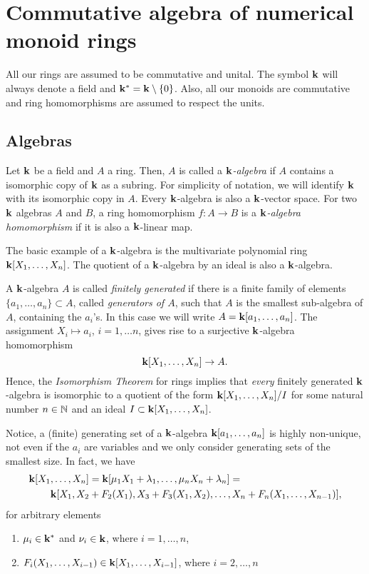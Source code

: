 \chapter{Commutative algebra of numerical monoid rings}

All our rings are assumed to be commutative and unital. The symbol $\mathbf{k}$ will always denote a field and $\mathbf{k}^*=\mathbf{k}\setminus\{0\}$. Also, all our monoids are commutative and ring homomorphisms are assumed to respect the units.

\section{Algebras}

Let $\mathbf{k}$ be a field and $A$ a ring. Then, $A$ is called a \emph{$\mathbf{k}$-algebra} if $A$ contains a isomorphic copy of $\mathbf{k}$ as a subring. For simplicity of notation, we will identify $\mathbf{k}$ with its isomorphic copy in $A$. Every $\mathbf{k}$-algebra is also a $\mathbf{k}$-vector space. For two $\mathbf{k}$ algebras $A$ and $B$, a ring homomorphism $f:A\to B$ is a \emph{$\mathbf{k}$-algebra homomorphism} if it is also a $\mathbf{k}$-linear map.

The basic example of a $\mathbf{k}$-algebra is the multivariate polynomial ring $\mathbf{k}[X_1,\ldots,X_n]$. The quotient of a $\mathbf{k}$-algebra by an ideal is also a $\mathbf{k}$-algebra.

A $\mathbf{k}$-algebra $A$ is called \emph{finitely generated} if there is a finite family of elements $\{a_1,\ldots,a_n\}\subset A$, called \emph{generators of $A$}, such that $A$ is the smallest sub-algebra of $A$, containing the $a_i$'s. In this case we will write $A=\mathbf{k}[a_1,\ldots,a_n]$. The assignment $X_i\mapsto a_i$, $i=1,\ldots n$, gives rise to a surjective $\mathbf{k}$-algebra homomorphism
$$
\mathbf{k}[X_1,\ldots,X_n]\to A.
$$
Hence, the \emph{Isomorphism Theorem} for rings implies that \emph{every} finitely generated $\mathbf{k}$-algebra is isomorphic to a quotient of the form $\mathbf{k}[X_1,\ldots,X_n]/I$ for some natural number $n\in\mathbb N$ and an ideal $I\subset\mathbf{k}[X_1,\ldots,X_n]$.

Notice, a (finite) generating set of a $\mathbf{k}$-algebra $\mathbf{k}[a_1,\ldots,a_n]$ is highly non-unique, not even if the $a_i$ are variables and we only consider generating sets of the smallest size. In fact, we have
\begin{align*}
\mathbf{k}[X_1&,\ldots,X_n]=\mathbf{k}[\mu_1X_1+\lambda_1,\ldots,\mu_nX_n+\lambda_n]=\\
&\mathbf{k}[X_1,X_2+F_2(X_1),X_3+F_3(X_1,X_2),\ldots,X_n+F_n(X_1,\ldots,X_{n-1})],
\end{align*}  
for arbitrary elements
\begin{enumerate}[label=(\alph*)]
\item $\mu_i\in\mathbf{k}^*$ and $\nu_i\in\mathbf{k}$, where $i=1,\ldots,n$,
\item $F_i(X_1,\ldots,X_{i-1})\in\mathbf{k}[X_1,\ldots, X_{i-1}]$, where $i=2,\ldots,n$
\end{enumerate}

